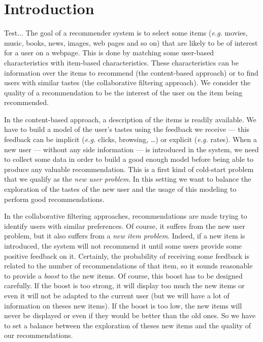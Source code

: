 \documentclass[twoside,leqno,twocolumn]{article}
\newcommand{\pp}[1]{\color{red}(pp) #1\color{black}}
\newcommand{\jm}[1]{{\color{TealBlue}(jm) #1\color{black}}}
\newcommand{\eg}{\textit{e.g.}}
\begin{document}
\section{Introduction}
Test...
The goal of a recommender system is to select some items (\eg{} movies,
music, books, news, images, web pages and so on) that are likely to be
of interest for a user on a webpage. This is done by matching some
user-based characteristics with item-based characteristics. These
characteristics can be information over the items to recommend (the
content-based approach) or to find users with similar tastes (the
collaborative filtering approach). 
   We consider the quality
of a recommendation to be the interest of the user on the item being
recommended.

In the content-based approach, a description of the items is readily
available. We have to build a model of the user's tastes using the
feedback we receive --- this feedback can be implicit (\eg{} clicks,
browsing, \ldots) or explicit (\eg{} rates). When a new user ---
without any side information --- is introduced in the system, we need
to collect some data in order to build a good enough model before
being able to produce any valuable recommendation. This is a first
kind of cold-start problem that we qualify as the \emph{new user
  problem}. In this setting we want to balance the exploration of the tastes of the new user and the usage of this modeling to perform good recommendations.  

In the collaborative filtering approaches, recommendations are made
trying to identify users with similar preferences. Of course, it
suffers from the new user problem, but it also suffers from a
\emph{new item problem}. Indeed, if a new item is introduced, the
system will not recommend it until some users provide some positive
feedback on it. Certainly, the probability of receiving some feedback
is related to the number of recommendations of that item, so it sounds
reasonable to provide a \emph{boost} to the new items. Of course, this
boost has to be designed carefully. If the boost is too strong, it will display too much the new items or even it will not be adapted to the current user (but we will have a lot of information on theses new items). If the boost is too low, the new items will never be displayed or even if they would be better than the old ones. So we  have to set a balance between the exploration of theses new items and the quality of our recommendations. 
\end{document}
